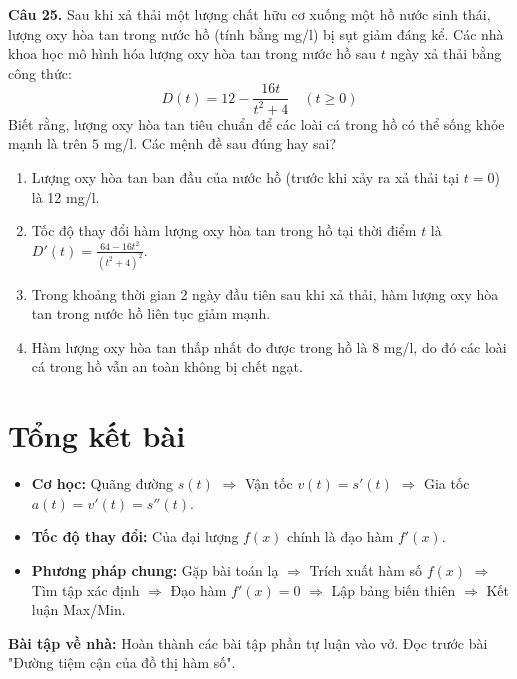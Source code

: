 \documentclass[12pt]{article}
\begin{document}
	\vspace{0.5cm}
	\noindent \textbf{Câu 25.} Sau khi xả thải một lượng chất hữu cơ xuống một hồ nước sinh thái, lượng oxy hòa tan trong nước hồ (tính bằng mg/l) bị sụt giảm đáng kể. Các nhà khoa học mô hình hóa lượng oxy hòa tan trong nước hồ sau $t$ ngày xả thải bằng công thức:
	\[ D(t) = 12 - \frac{16t}{t^2 + 4} \quad (t \ge 0) \]
	Biết rằng, lượng oxy hòa tan tiêu chuẩn để các loài cá trong hồ có thể sống khỏe mạnh là trên $5$ mg/l. Các mệnh đề sau đúng hay sai?
	\begin{enumerate}[label=\textbf{\alph*)}]
		\item Lượng oxy hòa tan ban đầu của nước hồ (trước khi xảy ra xả thải tại $t=0$) là 12 mg/l.   
		\item Tốc độ thay đổi hàm lượng oxy hòa tan trong hồ tại thời điểm $t$ là $D'(t) = \frac{64 - 16t^2}{(t^2 + 4)^2}$.   
		\item Trong khoảng thời gian 2 ngày đầu tiên sau khi xả thải, hàm lượng oxy hòa tan trong nước hồ liên tục giảm mạnh.   
		\item Hàm lượng oxy hòa tan thấp nhất đo được trong hồ là 8 mg/l, do đó các loài cá trong hồ vẫn an toàn không bị chết ngạt.   
	\end{enumerate}

	


	\section{Tổng kết bài}
	
	\begin{tcolorbox}[colback=yellow!10!white, colframe=orange!60!black,
		fonttitle=\bfseries, title={Cốt lõi cần nhớ}]
		\begin{itemize}
			\item \textbf{Cơ học:} Quãng đường $s(t)$ $\Rightarrow$ Vận tốc $v(t) = s'(t)$ $\Rightarrow$ Gia tốc $a(t) = v'(t) = s''(t)$.
			\item \textbf{Tốc độ thay đổi:} Của đại lượng $f(x)$ chính là đạo hàm $f'(x)$.
			\item \textbf{Phương pháp chung:} Gặp bài toán lạ $\Rightarrow$ Trích xuất hàm số $f(x)$ $\Rightarrow$ Tìm tập xác định $\Rightarrow$ Đạo hàm $f'(x)=0$ $\Rightarrow$ Lập bảng biến thiên $\Rightarrow$ Kết luận Max/Min.
		\end{itemize}
	\end{tcolorbox}
	
	\vspace{3mm}
	\textbf{Bài tập về nhà:} Hoàn thành các bài tập phần tự luận vào vở. Đọc trước bài "Đường tiệm cận của đồ thị hàm số".
	
\end{document}
